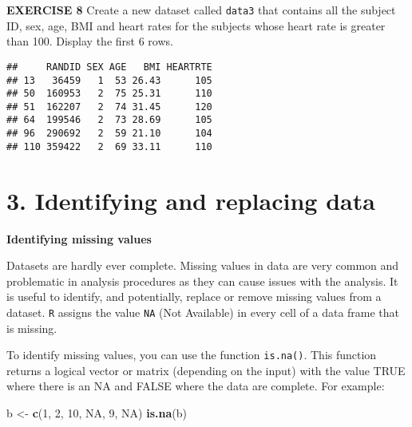 \documentclass[
]{article}
\newenvironment{Shaded}{\begin{snugshade}}{\end{snugshade}}
\newcommand{\CommentTok}[1]{\textcolor[rgb]{0.56,0.35,0.01}{\textit{#1}}}
\newcommand{\DecValTok}[1]{\textcolor[rgb]{0.00,0.00,0.81}{#1}}
\newcommand{\KeywordTok}[1]{\textcolor[rgb]{0.13,0.29,0.53}{\textbf{#1}}}
\newcommand{\NormalTok}[1]{#1}
\newcommand{\OperatorTok}[1]{\textcolor[rgb]{0.81,0.36,0.00}{\textbf{#1}}}
\newcommand{\OtherTok}[1]{\textcolor[rgb]{0.56,0.35,0.01}{#1}}
\newcommand{\StringTok}[1]{\textcolor[rgb]{0.31,0.60,0.02}{#1}}
\begin{document}
\textbf{EXERCISE 8} Create a new dataset called \texttt{data3} that
contains all the subject ID, sex, age, BMI and heart rates for the
subjects whose heart rate is greater than 100. Display the first 6 rows.

\begin{Shaded}
\end{Shaded}

\begin{verbatim}
##     RANDID SEX AGE   BMI HEARTRTE
## 13   36459   1  53 26.43      105
## 50  160953   2  75 25.31      110
## 51  162207   2  74 31.45      120
## 64  199546   2  73 28.69      105
## 96  290692   2  59 21.10      104
## 110 359422   2  69 33.11      110
\end{verbatim}

\hypertarget{identifying-and-replacing-data}{%
\section{3. Identifying and replacing
data}\label{identifying-and-replacing-data}}

\textbf{Identifying missing values}

Datasets are hardly ever complete. Missing values in data are very
common and problematic in analysis procedures as they can cause issues
with the analysis. It is useful to identify, and potentially, replace or
remove missing values from a dataset. \texttt{R} assigns the value
\texttt{NA} (Not Available) in every cell of a data frame that is
missing.

To identify missing values, you can use the function \texttt{is.na()}.
This function returns a logical vector or matrix (depending on the
input) with the value TRUE where there is an NA and FALSE where the data
are complete. For example:

\begin{Shaded}
\begin{Highlighting}[]
\NormalTok{b <-}\StringTok{ }\KeywordTok{c}\NormalTok{(}\DecValTok{1}\NormalTok{, }\DecValTok{2}\NormalTok{, }\DecValTok{10}\NormalTok{, }\OtherTok{NA}\NormalTok{, }\DecValTok{9}\NormalTok{, }\OtherTok{NA}\NormalTok{)}
\KeywordTok{is.na}\NormalTok{(b)}
\end{Highlighting}
\end{Shaded}
\end{document}

